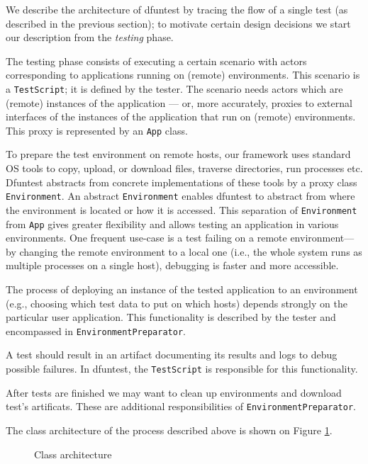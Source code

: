 We describe the architecture of dfuntest by tracing the flow of a single test (as
described in the previous section); to motivate certain design decisions we
start our description from the \emph{testing} phase.

The testing phase consists of executing a certain scenario with actors
corresponding to applications running on (remote) environments.
This scenario is a \texttt{TestScript}; it is defined by the tester. The
scenario needs actors which are (remote) instances of the application --- or, more
accurately, proxies to external interfaces of the instances of the application that run on (remote) 
environments.
This proxy is represented by an \texttt{App} class.

To prepare the test environment on remote hosts, our framework uses standard OS
tools to copy, upload, or download files, traverse directories, run processes
etc.  Dfuntest abstracts from concrete implementations of these tools by a proxy
class \texttt{Environment}.
An abstract \texttt{Environment} enables dfuntest to abstract from where the
environment is located or how it is accessed.
This separation of \texttt{Environment} from \texttt{App} gives greater
flexibility and allows testing an application in various environments.
One frequent use-case is a test failing on a remote environment---by changing
the remote environment to a local one (i.e., the whole system runs as multiple
processes on a single host), debugging is faster and more accessible.

The process of deploying an instance of the tested application to an
environment (e.g., choosing which test data to put on which hosts)
depends strongly on the particular user application. This functionality is
described by the tester and encompassed in \texttt{EnvironmentPreparator}.

A test should result in an artifact documenting its results and logs to debug
possible failures. In dfuntest, the \texttt{TestScript} is responsible for this
functionality.

After tests are finished we may want to clean up environments and download test's artificats.
These are additional responsibilities of \texttt{EnvironmentPreparator}.

The class architecture of the process described above is shown on Figure
\ref{fig:4_class_architecture}.

\begin{figure}[tbp]
  \centering
  \def\svgwidth{\columnwidth}
  \scriptsize {
  
}
\caption{Class architecture}
\label{fig:4_class_architecture}
\end{figure}

